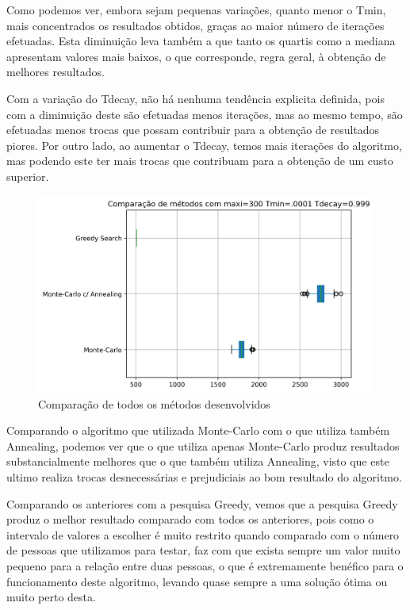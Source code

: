 \documentclass[a4paper]{report}
\begin{document}
\pagebreak
Como podemos ver, embora sejam pequenas variações, quanto
menor o Tmin, mais concentrados os resultados obtidos, graças ao maior número de
iterações efetuadas. Esta diminuição leva também a que tanto os quartis como a
mediana apresentam valores mais baixos, o que corresponde, regra geral, à obtenção de
melhores resultados.

Com a variação do Tdecay, não há nenhuma tendência explicita definida, pois com
a diminuição deste são efetuadas menos iterações, mas ao mesmo tempo, são
efetuadas menos trocas que possam contribuir para a obtenção de resultados
piores. Por outro lado, ao aumentar o Tdecay, temos mais iterações do
algoritmo, mas podendo este ter mais trocas que contribuam para a obtenção de um
custo superior.

\pagebreak
\begin{figure}[h]
    \centering
        \includegraphics[width=\textwidth]{images/graph_comp_all_algorithms.png}
        \caption{Comparação de todos os métodos desenvolvidos}
\end{figure}

Comparando o algoritmo que utilizada Monte-Carlo com o que utiliza também
Annealing, podemos ver que o que utiliza apenas Monte-Carlo produz resultados
substancialmente melhores que o que também utiliza Annealing, visto que este
ultimo realiza trocas desnecessárias e prejudiciais ao bom resultado do
algoritmo.

Comparando os anteriores com a pesquisa Greedy, vemos que a pesquisa Greedy
produz o melhor resultado comparado com todos os anteriores, pois como o
intervalo de valores a escolher é muito restrito quando comparado com o número
de pessoas que utilizamos para testar, faz com que exista sempre um valor muito
pequeno para a relação entre duas pessoas, o que é extremamente benéfico para o
funcionamento deste algoritmo, levando quase sempre a uma solução ótima ou muito
perto desta.
\end{document}

